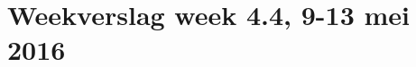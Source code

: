 \documentclass[11pt,a4paper]{article}
\begin{document}
\section*{Weekverslag week 4.4, 9-13 mei 2016}




\end{document}
